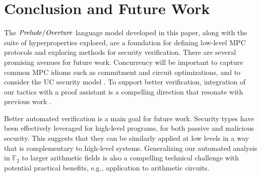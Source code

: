 \section{Conclusion and Future Work}

The $\mathit{Prelude}/\mathit{Overture}$ language model developed in this paper, along
with the suite of hyperproperties explored, are a foundation
for defining low-level MPC protocols and exploring methods for security
verification.  There are several promising avenues for future
work. Concurrency will be important to capture common MPC idioms such
as commitment and circuit optimizations, and to consider the UC
security model \cite{evans2018pragmatic,viaduct-UC}. To support better
verification, integration of our tactics with a proof assistant is a
compelling direction that resonate with previous work \cite{8429300}.

Better automated verification is a main goal for future work.
Security types have been effectively leveraged for high-level
programs, for both passive and malicious security. This suggests that
they can be similarly applied at low levels in a way that is
complementary to high-level systems. Generalizing our automated
analysis in $\mathbb{F}_2$ to larger arithmetic fields is also a
compelling technical challenge with potential practical benefits,
e.g., application to arithmetic circuits. 
